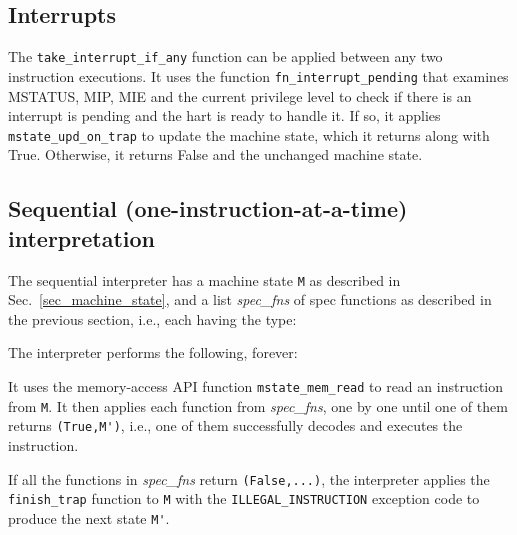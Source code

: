 \documentclass[11pt]{article}
\newcommand{\hmm}{\hspace*{2em}}
\newcommand{\hmmm}{\hspace*{3em}}
\begin{document}



\subsection{Interrupts}

\label{sec_interrupts}



The \verb|take_interrupt_if_any| function can be applied between any
two instruction executions. It uses the function
\verb|fn_interrupt_pending| that examines MSTATUS, MIP, MIE and the
current privilege level to check if there is an interrupt is pending
and the hart is ready to handle it.  If so, it applies
\verb|mstate_upd_on_trap| to update the machine state, which it
returns along with True.  Otherwise, it returns False and the
unchanged machine state.


\subsection{Sequential (one-instruction-at-a-time)  interpretation}

The sequential interpreter has a machine state \verb|M| as described
in Sec.~\ref{sec_machine_state}, and a list \emph{spec\_fns} of spec
functions as described in the previous section, i.e., each having the
type:

\hmmm {\tt Machine\_State -> Instr -> (Bool, Machine\_State)}

The interpreter performs the following, forever:

\hmm \begin{minipage}[t]{5in}

It uses the memory-access API function \verb|mstate_mem_read| to read
an instruction from \verb|M|.  It then applies each function from
\emph{spec\_fns}, one by one until one of them returns
\verb|(True,M')|, i.e., one of them successfully decodes and executes
the instruction.

\vspace*{1ex}

If all the functions in \emph{spec\_fns} return \verb|(False,...)|,
the interpreter applies the \verb|finish_trap| function to \verb|M|
with the \verb|ILLEGAL_INSTRUCTION| exception code to produce the next
state \verb|M'|.

\end{minipage}
\end{document}
